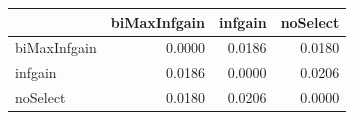 \begin{tabular}{lrrr}
\toprule
 & biMaxInfgain & infgain & noSelect \\
\midrule
biMaxInfgain & 0.0000 & 0.0186 & 0.0180 \\
infgain & 0.0186 & 0.0000 & 0.0206 \\
noSelect & 0.0180 & 0.0206 & 0.0000 \\
\bottomrule
\end{tabular}
